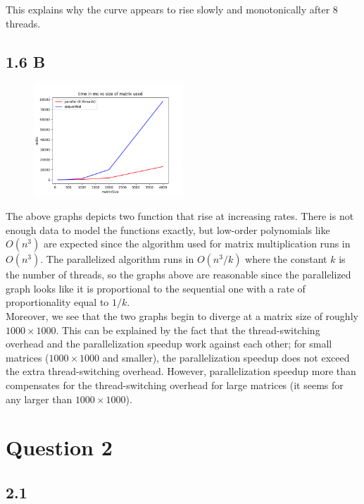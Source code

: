 \documentclass[11pt, letterpaper]{article}
\begin{document}
This explains why the curve appears to rise slowly and monotonically after 8 threads.

\subsection*{1.6 B}

\begin{figure}[h]
    \centering
    \includegraphics[width=0.5\textwidth]{matrix_size_plot.png}
\end{figure}

The above graphs depicts two function that rise at increasing rates. There is not enough data to
model the functions exactly, but low-order polynomials like $O(n^3)$ are expected since the algorithm
used for matrix multiplication runs in $O(n^3)$. The parallelized algorithm runs in $O(n^3/k)$ where
the constant $k$ is the number of threads, so the graphs above are reasonable since the parallelized
graph looks like it is proportional to the sequential one with a rate of proportionality equal to
$1/k$.\\

Moreover, we see that the two graphs begin to diverge at a matrix size of roughly $1000 \times 1000$. This can be explained by the fact that the thread-switching overhead and the parallelization speedup work against each other; for small matrices ($1000 \times 1000$ and smaller), the parallelization speedup does not exceed the extra thread-switching overhead. However, parallelization speedup more than compensates for the thread-switching overhead for large matrices (it seems for any larger than $1000 \times 1000$).

\pagebreak

\section*{Question 2}

\subsection*{2.1}
\end{document}
